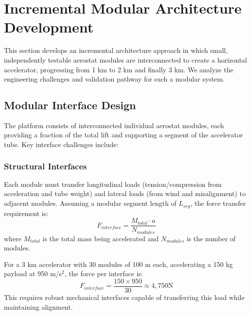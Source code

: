 \section{Incremental Modular Architecture Development}
\label{sec:incremental}

This section develops an incremental architecture approach in which small, independently testable aerostat modules are interconnected to create a horizontal accelerator, progressing from 1 km to 2 km and finally 3 km. We analyze the engineering challenges and validation pathway for such a modular system.

\subsection{Modular Interface Design}
The platform consists of interconnected individual aerostat modules, each providing a fraction of the total lift and supporting a segment of the accelerator tube. Key interface challenges include:

\subsubsection{Structural Interfaces}
Each module must transfer longitudinal loads (tension/compression from acceleration and tube weight) and lateral loads (from wind and misalignment) to adjacent modules. Assuming a modular segment length of $L_{seg}$, the force transfer requirement is:
\begin{equation}
F_{interface} = \frac{M_{total} \cdot a}{N_{modules}}
\end{equation}
where $M_{total}$ is the total mass being accelerated and $N_{modules}$ is the number of modules.

For a 3 km accelerator with 30 modules of 100 m each, accelerating a 150 kg payload at 950 m/s$^2$, the force per interface is:
\begin{equation}
F_{interface} = \frac{150 \times 950}{30} \approx 4,750  \text{N}
\end{equation}
This requires robust mechanical interfaces capable of transferring this load while maintaining alignment.

